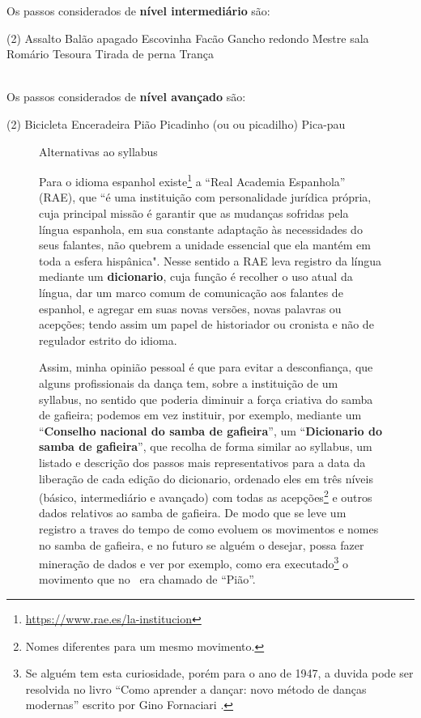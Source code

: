 Os passos considerados de \textbf{nível intermediário} são:
\begin{tasks}(2)
\task Assalto
\task Balão apagado
\task Escovinha
\task Facão
\task Gancho redondo
\task Mestre sala
\task Romário
\task Tesoura
\task Tirada de perna
\task Trança
\end{tasks}~\\

Os passos considerados de \textbf{nível avançado} são:
\begin{tasks}(2)
\task Bicicleta
\task Enceradeira
\task Pião
\task Picadinho (ou ou picadilho)
\task Pica-pau
\end{tasks}



\begin{figure}[t]
\begin{elaboracion}{Alternativas ao syllabus}

Para o idioma espanhol existe\footnote{\url{https://www.rae.es/la-institucion}} a ``Real Academia Espanhola'' (RAE),
que ``é uma instituição com personalidade jurídica própria, cuja principal missão é garantir 
que as mudanças sofridas pela língua espanhola, 
em sua constante adaptação às necessidades do seus falantes, 
não quebrem a unidade essencial que ela mantém em toda a esfera hispânica".
Nesse sentido a RAE leva registro da língua mediante um \textbf{dicionario},
cuja função é recolher o uso atual da língua, dar um marco comum de comunicação aos falantes de espanhol,
e agregar em suas novas versões, novas palavras ou acepções;
tendo assim um papel de historiador ou cronista e não de regulador estrito do idioma.

Assim, minha opinião pessoal é que para evitar a desconfiança, que alguns profissionais da dança tem,
sobre a instituição de um syllabus, no sentido  que poderia diminuir a força criativa do samba de gafieira;
podemos em vez instituir, por exemplo, mediante um ``\textbf{Conselho nacional do samba de gafieira}'',
um ``\textbf{Dicionario do samba de gafieira}'', que recolha de forma similar ao syllabus,
um listado e descrição dos passos mais representativos para a data da liberação de cada edição do dicionario, 
ordenado eles em três níveis (básico, intermediário e avançado) 
com todas as acepções\footnote{Nomes diferentes para um mesmo movimento.}
e outros dados relativos ao samba de gafieira.
De modo que se leve um registro a traves do tempo de como evoluem os movimentos e nomes no samba de gafieira,
e no futuro se alguém o desejar, possa fazer mineração de dados e ver 
por exemplo, como era executado\footnote{Se alguém tem esta curiosidade,
porém para o ano de 1947, a duvida pode ser resolvida no livro
``Como aprender a dançar: novo método de danças modernas'' escrito por Gino Fornaciari \cite[pp. 72]{fornaciari1947aprender}.} 
o movimento que no \AnoLivro~era chamado de ``Pião''.
\end{elaboracion}
\label{fig:ImportanciaSyllabus}
\end{figure}


